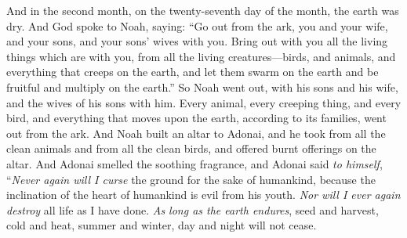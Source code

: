\begin{biblechapter}
\verse And in the second month, on the twenty-seventh day of the month, the earth was dry.
\verse And God spoke to Noah, saying:
\verse “Go out from the ark, you and your wife, and your sons, and your sons’ wives with you.
\verse Bring out with you all the living things which are with you, from all the living creatures—birds, and animals, and everything that creeps on the earth, and let them swarm on the earth and be fruitful and multiply on the earth.”
\verse So Noah went out, with his sons and his wife, and the wives of his sons with him.
\verse Every animal, every creeping thing, and every bird, and everything that moves upon the earth, according to its families, went out from the ark.
\verse And Noah built an altar to Adonai, and he took from all the clean animals and from all the clean birds, and offered burnt offerings on the altar.
\verse And Adonai smelled the soothing fragrance, and Adonai said \textit{to himself}, “\textit{Never again will I curse} the ground for the sake of humankind, because the inclination of the heart of humankind is evil from his youth. \textit{Nor will I ever again destroy} all life as I have done.
\verse \textit{As long as the earth endures}, seed and harvest, cold and heat, summer and winter, day and night will not cease.
\end{biblechapter}

